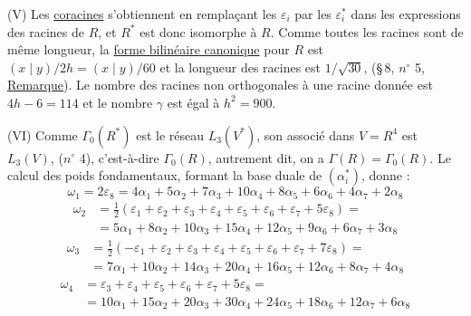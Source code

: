 (V) Les \uline{coracines} s'obtiennent en remplaçant les $\varepsilon_i$ par les $\varepsilon_i^*$ dans les expressions des racines de $R$, et $R^*$ est donc isomorphe à $R$. Comme toutes les racines sont de même longueur, la \uline{forme bilinéaire canonique} pour $R$ est $(x\mid y)/2h=(x\mid y)/60$ et la longueur des racines est $1/\sqrt{30}$, (\S\,8, $n^\circ$ 5, \uline{Remarque}). Le nombre des racines non orthogonales à une racine donnée est $4h-6=114$ et le nombre $\gamma$ est égal à $h^2=900$.

(VI) Comme $\Gamma_0(R^*)$ est le réseau $L_3(V^*)$, son associé dans $V=R^4$ est $L_3(V)$, ($n^\circ$ 4), c'est-à-dire $\Gamma_0(R)$, autrement dit, on a $\Gamma(R)=\Gamma_0(R)$. Le calcul des poids fondamentaux, formant la base duale de $(\alpha_i^*)$, donne :
\[
\omega_1=2\varepsilon_8=4\alpha_1+5\alpha_2+7\alpha_3+10\alpha_4+8\alpha_5+6\alpha_6+4\alpha_7+2\alpha_8
\]
\[
\begin{aligned}
\omega_2&=\tfrac12(\varepsilon_1+\varepsilon_2+\varepsilon_3+\varepsilon_4+\varepsilon_5+\varepsilon_6+\varepsilon_7+5\varepsilon_8)=\\
&=5\alpha_1+8\alpha_2+10\alpha_3+15\alpha_4+12\alpha_5+9\alpha_6+6\alpha_7+3\alpha_8
\end{aligned}
\]
\[
\begin{aligned}
\omega_3&=\tfrac12(-\varepsilon_1+\varepsilon_2+\varepsilon_3+\varepsilon_4+\varepsilon_5+\varepsilon_6+\varepsilon_7+7\varepsilon_8)=\\
&=7\alpha_1+10\alpha_2+14\alpha_3+20\alpha_4+16\alpha_5+12\alpha_6+8\alpha_7+4\alpha_8
\end{aligned}
\]
\[
\begin{aligned}
\omega_4&=\varepsilon_3+\varepsilon_4+\varepsilon_5+\varepsilon_6+\varepsilon_7+5\varepsilon_8=\\
&=10\alpha_1+15\alpha_2+20\alpha_3+30\alpha_4+24\alpha_5+18\alpha_6+12\alpha_7+6\alpha_8
\end{aligned}
\]
